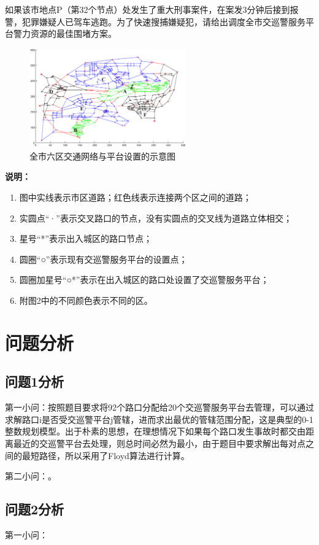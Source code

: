 \documentclass[withoutpreface,bwprint]{cumcmthesis} %
\begin{document}
	如果该市地点P（第32个节点）处发生了重大刑事案件，在案发3分钟后接到报警，犯罪嫌疑人已驾车逃跑。为了快速搜捕嫌疑犯，请给出调度全市交巡警服务平台警力资源的最佳围堵方案。
	\begin{figure}[H]
		\centering
		\includegraphics[width=0.6\textwidth]{全市六区交通网络与平台设置的示意图.png}
		\caption{全市六区交通网络与平台设置的示意图}\label{全市交通网络示意图}
	\end{figure}
	
	\textbf{说明：}
	\begin{enumerate}[itemindent=2em]
		\item 图中实线表示市区道路；红色线表示连接两个区之间的道路；
		\item 实圆点“·”表示交叉路口的节点，没有实圆点的交叉线为道路立体相交；
		\item 星号“*”表示出入城区的路口节点；
		\item 圆圈“○”表示现有交巡警服务平台的设置点；
		\item 圆圈加星号“○*”表示在出入城区的路口处设置了交巡警服务平台；
		\item 附图2中的不同颜色表示不同的区。 
	\end{enumerate}
	
	
	\section{问题分析}
	\subsection{问题1分析}
	第一小问：按照题目要求将92个路口分配给20个交巡警服务平台去管理，可以通过求解路口i是否受交巡警平台j管辖，进而求出最优的管辖范围分配，这是典型的0-1整数规划模型。出于朴素的思想，在理想情况下如果每个路口发生事故时都交由距离最近的交巡警平台去处理，则总时间必然为最小，由于题目中要求解出每对点之间的最短路径，所以采用了Floyd算法进行计算。
	
	第二小问：。
	
	\subsection{问题2分析}	
	第一小问：
	
\end{document}
